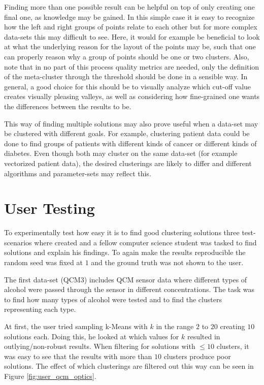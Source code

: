 \documentclass[
	a4paper,
	english,
	twoside,
	openright,               
	11pt                            
	]{report}
\begin{document}
Finding more than one possible result can be helpful on top of only creating one final one, as knowledge may be gained. In this simple case it is easy to recognize how the left and right groups of points relate to each other but for more complex data-sets this may difficult to see. Here, it would for example be beneficial to look at what the underlying reason for the layout of the points may be, such that one can properly reason why a group of points should be one or two clusters. Also, note that in no part of this process quality metrics are needed, only the definition of the meta-cluster through the threshold should be done in a sensible way. In general, a good choice for this should be to visually analyze which cut-off value creates visually pleasing valleys, as well as considering how fine-grained one wants the differences between the results to be.

This way of finding multiple solutions may also prove useful when a data-set may be clustered with different goals. For example, clustering patient data could be done to find groups of patients with different kinds of cancer or different kinds of diabetes. Even though both may cluster on the same data-set (for example vectorized patient data), the desired clusterings are likely to differ and different algorithms and parameter-sets may reflect this.

\section{User Testing}\label{sec:user_test}
To experimentally test how easy it is to find good clustering solutions three test-scenarios where created and a fellow computer science student was tasked to find solutions and explain his findings. To again make the results reproducible the random seed was fixed at $1$ and the ground truth was not shown to the user.

The first data-set (QCM3) \cite{qcm} includes QCM sensor data where different types of alcohol were passed through the sensor in different concentrations. The task was to find how many types of alcohol were tested and to find the clusters representing each type.

At first, the user tried sampling k-Means with $k$ in the range $2$ to $20$ creating $10$ solutions each. Doing this, he looked at which values for $k$ resulted in outlying/non-robust results. When filtering for solutions with $\leq10$ clusters, it was easy to see that the results with more than $10$ clusters produce poor solutions. The effect of which clusterings are filtered out this way can be seen in Figure \ref{fig:user_qcm_optics}.
\end{document}
